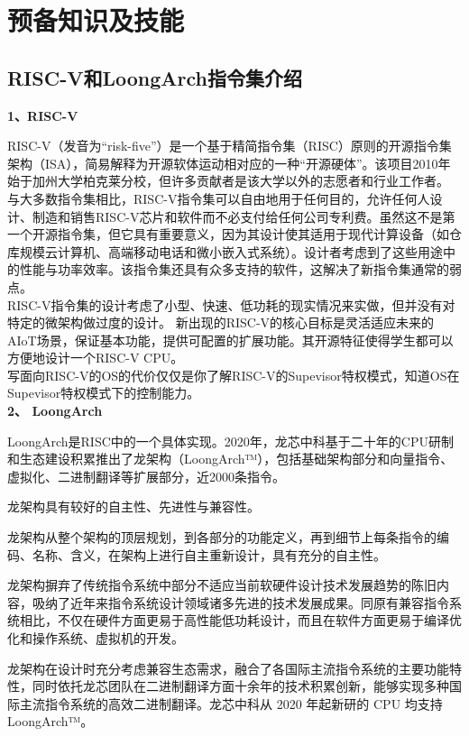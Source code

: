 \section{预备知识及技能}
\subsection{RISC-V和LoongArch指令集介绍}
\textbf{1、RISC-V}

RISC-V（发音为“risk-five”）是一个基于精简指令集（RISC）原则的开源指令集架构（ISA），简易解释为开源软体运动相对应的一种“开源硬体”。该项目2010年始于加州大学柏克莱分校，但许多贡献者是该大学以外的志愿者和行业工作者。\\
与大多数指令集相比，RISC-V指令集可以自由地用于任何目的，允许任何人设计、制造和销售RISC-V芯片和软件而不必支付给任何公司专利费。虽然这不是第一个开源指令集，但它具有重要意义，因为其设计使其适用于现代计算设备（如仓库规模云计算机、高端移动电话和微小嵌入式系统）。设计者考虑到了这些用途中的性能与功率效率。该指令集还具有众多支持的软件，这解决了新指令集通常的弱点。\\
RISC-V指令集的设计考虑了小型、快速、低功耗的现实情况来实做，但并没有对特定的微架构做过度的设计。
新出现的RISC-V的核心目标是灵活适应未来的AIoT场景，保证基本功能，提供可配置的扩展功能。其开源特征使得学生都可以方便地设计一个RISC-V CPU。\\
写面向RISC-V的OS的代价仅仅是你了解RISC-V的Supevisor特权模式，知道OS在Supevisor特权模式下的控制能力。\\
\textbf{2、 LoongArch}

LoongArch是RISC中的一个具体实现。2020年，龙芯中科基于二十年的CPU研制和生态建设积累推出了龙架构（LoongArch™），包括基础架构部分和向量指令、虚拟化、二进制翻译等扩展部分，近2000条指令。

龙架构具有较好的自主性、先进性与兼容性。

龙架构从整个架构的顶层规划，到各部分的功能定义，再到细节上每条指令的编码、名称、含义，在架构上进行自主重新设计，具有充分的自主性。

龙架构摒弃了传统指令系统中部分不适应当前软硬件设计技术发展趋势的陈旧内容，吸纳了近年来指令系统设计领域诸多先进的技术发展成果。同原有兼容指令系统相比，不仅在硬件方面更易于高性能低功耗设计，而且在软件方面更易于编译优化和操作系统、虚拟机的开发。

龙架构在设计时充分考虑兼容生态需求，融合了各国际主流指令系统的主要功能特性，同时依托龙芯团队在二进制翻译方面十余年的技术积累创新，能够实现多种国际主流指令系统的高效二进制翻译。龙芯中科从 2020 年起新研的 CPU 均支持LoongArch™。


